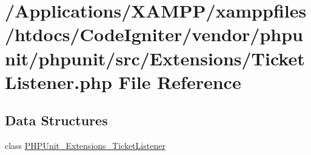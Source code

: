 \hypertarget{_ticket_listener_8php}{}\section{/\+Applications/\+X\+A\+M\+P\+P/xamppfiles/htdocs/\+Code\+Igniter/vendor/phpunit/phpunit/src/\+Extensions/\+Ticket\+Listener.php File Reference}
\label{_ticket_listener_8php}
\subsection*{Data Structures}
\begin{DoxyCompactItemize}
\item 
class \mbox{\hyperlink{class_p_h_p_unit___extensions___ticket_listener}{P\+H\+P\+Unit\+\_\+\+Extensions\+\_\+\+Ticket\+Listener}}
\end{DoxyCompactItemize}
